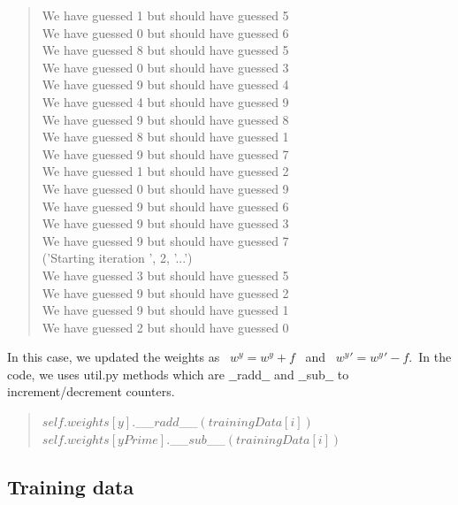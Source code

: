 \documentclass{article}
\begin{document}
\begin{quote}
        We have guessed 1 but should have guessed 5\\
        We have guessed 0 but should have guessed 6\\
        We have guessed 8 but should have guessed 5\\
        We have guessed 0 but should have guessed 3\\
        We have guessed 9 but should have guessed 4\\
        We have guessed 4 but should have guessed 9\\
        We have guessed 9 but should have guessed 8\\
        We have guessed 8 but should have guessed 1\\
        We have guessed 9 but should have guessed 7\\
        We have guessed 1 but should have guessed 2\\
        We have guessed 0 but should have guessed 9\\
        We have guessed 9 but should have guessed 6\\
        We have guessed 9 but should have guessed 3\\
        We have guessed 9 but should have guessed 7\\
        ('Starting iteration ', 2, '...')\\
        We have guessed 3 but should have guessed 5\\
        We have guessed 9 but should have guessed 2\\
        We have guessed 9 but should have guessed 1\\
        We have guessed 2 but should have guessed 0\\
        \end{quote}
            

        
        In this case, we updated the weights as \ $w^y = w^y + f$ \ and \ $w^y' = w^y' - f$.\ In the code, we uses util.py methods which are $\_\_$radd$\_\_$ and $\_\_$sub$\_\_$ to increment/decrement counters.
        \begin{quote}
            $self.weights[y].$\_\_$radd$\_\_$(trainingData[i])$\\
            $self.weights[yPrime].$\_\_$sub$\_\_$(trainingData[i])$
        \end{quote}
            
    \subsection{Training data}
\end{document}
